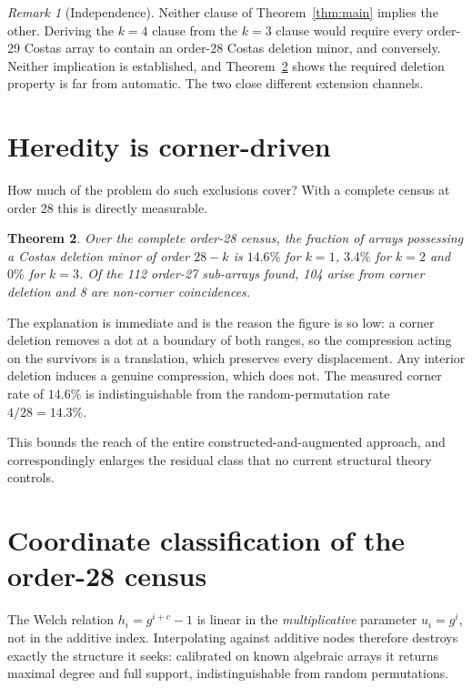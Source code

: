 \documentclass[11pt,a4paper]{article}
\newtheorem{theorem}{Theorem}[section]
\theoremstyle{definition}
\theoremstyle{remark}
\newtheorem{remark}[theorem]{Remark}
\begin{document}
\begin{remark}[Independence]
Neither clause of Theorem~\ref{thm:main} implies the other. Deriving the $k=4$
clause from the $k=3$ clause would require every order-29 Costas array to contain
an order-28 Costas deletion minor, and conversely. Neither implication is
established, and Theorem~\ref{thm:hered} shows the required deletion property is
far from automatic. The two close different extension channels.
\end{remark}

\section{Heredity is corner-driven}
\label{sec:hered}

How much of the problem do such exclusions cover? With a complete census at order
28 this is directly measurable.

\begin{theorem}\label{thm:hered}
Over the complete order-28 census, the fraction of arrays possessing a Costas
deletion minor of order $28-k$ is $14.6\%$ for $k=1$, $3.4\%$ for $k=2$ and $0\%$
for $k=3$. Of the 112 order-27 sub-arrays found, 104 arise from corner deletion
and 8 are non-corner coincidences.
\end{theorem}

The explanation is immediate and is the reason the figure is so low: a corner
deletion removes a dot at a boundary of both ranges, so the compression acting on
the survivors is a translation, which preserves every displacement. Any interior
deletion induces a genuine compression, which does not. The measured corner rate
of $14.6\%$ is indistinguishable from the random-permutation rate $4/28=14.3\%$.

This bounds the reach of the entire constructed-and-augmented approach, and
correspondingly enlarges the residual class that no current structural theory
controls.

\section{Coordinate classification of the order-28 census}
\label{sec:coord}

The Welch relation $h_i = g^{i+c}-1$ is linear in the \emph{multiplicative}
parameter $u_i=g^i$, not in the additive index. Interpolating against additive
nodes therefore destroys exactly the structure it seeks: calibrated on known
algebraic arrays it returns maximal degree and full support, indistinguishable
from random permutations.
\end{document}
